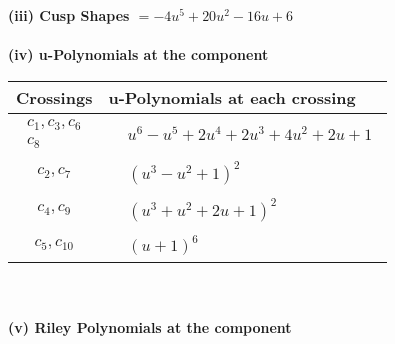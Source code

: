 \documentclass[1p]{elsarticle_modified}
\theoremstyle{definition}
\begin{document}
\flushleft \textbf{(iii) Cusp Shapes $= -4 u^5+20 u^2-16 u+6$}\\~\\
\newpage\renewcommand{\arraystretch}{1}
\flushleft \textbf{(iv) u-Polynomials at the component}\newline \\
\begin{tabular}{m{50pt}|m{274pt}}
Crossings & \hspace{64pt}u-Polynomials at each crossing \\
\hline $$\begin{aligned}c_{1},c_{3},c_{6}\\c_{8}\end{aligned}$$&$\begin{aligned}
&u^6- u^5+2 u^4+2 u^3+4 u^2+2 u+1
\end{aligned}$\\
\hline $$\begin{aligned}c_{2},c_{7}\end{aligned}$$&$\begin{aligned}
&(u^3- u^2+1)^2
\end{aligned}$\\
\hline $$\begin{aligned}c_{4},c_{9}\end{aligned}$$&$\begin{aligned}
&(u^3+u^2+2 u+1)^2
\end{aligned}$\\
\hline $$\begin{aligned}c_{5},c_{10}\end{aligned}$$&$\begin{aligned}
&(u+1)^6
\end{aligned}$\\
\hline
\end{tabular}\\~\\
\newpage\renewcommand{\arraystretch}{1}
\flushleft \textbf{(v) Riley Polynomials at the component}\newline \\
\end{document}

